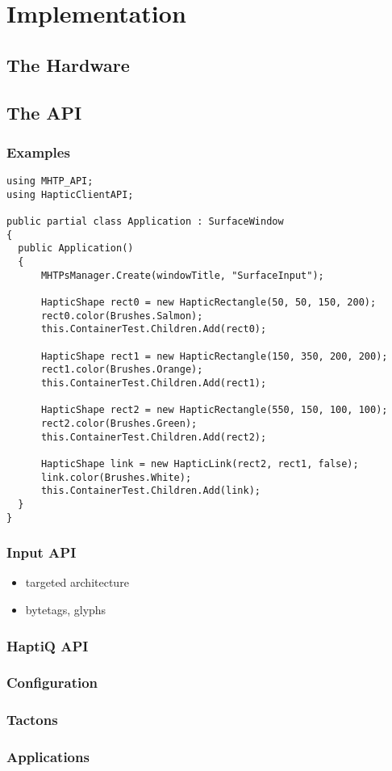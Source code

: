 \chapter{Implementation}

\section{The Hardware}

\section{The API}

\subsection{Examples}

\lstset{style=sharpc}
\begin{lstlisting}
using MHTP_API;
using HapticClientAPI;

public partial class Application : SurfaceWindow
{
  public Application()
  {
      MHTPsManager.Create(windowTitle, "SurfaceInput");
      
      HapticShape rect0 = new HapticRectangle(50, 50, 150, 200);
      rect0.color(Brushes.Salmon);
      this.ContainerTest.Children.Add(rect0);
      
      HapticShape rect1 = new HapticRectangle(150, 350, 200, 200);
      rect1.color(Brushes.Orange);
      this.ContainerTest.Children.Add(rect1);
      
      HapticShape rect2 = new HapticRectangle(550, 150, 100, 100);
      rect2.color(Brushes.Green);
      this.ContainerTest.Children.Add(rect2);
      
      HapticShape link = new HapticLink(rect2, rect1, false);
      link.color(Brushes.White);
      this.ContainerTest.Children.Add(link);
  }
}
\end{lstlisting}

\subsection{Input API}

\begin{itemize}
	\item targeted architecture
    \item bytetags, glyphs
\end{itemize}

\subsection{HaptiQ API}

\subsection{Configuration}

\subsection{Tactons}

\subsection{Applications}



